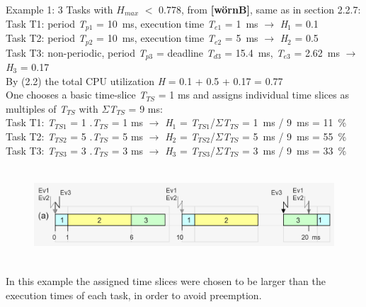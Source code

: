 Example 1: 3 Tasks with $H_{max}$ $<$ 0.778, from \textbf{[wörnB]}, same as in section 2.2.7:\\
Task T1: period \textit{T}${}_{p1}$ = 10~ms, execution time \textit{T}${}_{e1}$ = 1~ms $\rightarrow$ \textit{H}${}_{1}$ = 0.1\\
Task T2: period \textit{T}${}_{p2}$ = 10~ms, execution time\textit{ T}${}_{e2}$ = 5~ms $\rightarrow$ \textit{H}${}_{2}$ = 0.5\\
Task T3: non-periodic, period \textit{T}${}_{p3}$ = deadline \textit{T}${}_{d3}$ = 15.4~ms, \textit{T}${}_{e3}$ = 2.62~ms $\rightarrow$ \textit{H}${}_{3}$ = 0.17\\


By (2.2) the total CPU utilization \textit{H} = 0.1 + 0.5 + 0.17 = 0.77 \\

One chooses a basic time-slice \textit{T}${}_{TS}$ = 1 ms and assigns individual time slices as multiples of \textit{T}${}_{TS}$ with $\Sigma$\textit{T}${}_{TS}$ = 9 ms:\\

Task T1:    \textit{T}${}_{TS1}$ = 1 $.$\textit{T}${}_{TS}$ = 1 ms $\rightarrow$ \textit{H}${}_{1}$ = \textit{T}${}_{TS1}$/$\Sigma$\textit{T}${}_{TS}$ = 1~ms / 9~ms = 11~\%\\
Task T2:    \textit{T}${}_{TS2}$ = 5 $.$\textit{T}${}_{TS}$ = 5 ms $\rightarrow$ \textit{H}${}_{2}$ = \textit{T}${}_{TS2}$/$\Sigma$\textit{T}${}_{TS}$ = 5~ms / 9~ms = 55~\%\\
Task T3:     \textit{T}${}_{TS3}$ = 3 $.$\textit{T}${}_{TS}$ = 3 ms $\rightarrow$ \textit{H}${}_{3}$ = \textit{T}${}_{TS3}$/$\Sigma$\textit{T}${}_{TS}$ = 3~ms / 9~ms = 33~\%\\

	\begin{figure}[h]
    \centering
    \includegraphics[width=14cm, height=3.5cm]{Images/image91.png}
    \label{fig:Fig }
    \end{figure}

In this example the assigned time slices were chosen to be larger than the execution times of each task, in order to avoid preemption.\\

